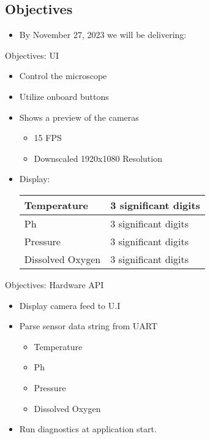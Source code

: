 \documentclass[14pt, aspectratio=169]{beamer}
\begin{document}
\subsection{Objectives}
\begin{frame}
	\begin{itemize}
		\item By November 27, 2023 we will be delivering:
	\end{itemize}
\end{frame}
\begin{frame}{Objectives: UI}
	\begin{itemize}
		\item Control the microscope
		\item Utilize onboard buttons
		\item Shows a preview of the cameras
		      \begin{itemize}
			      \item 15 FPS
			      \item Downscaled 1920x1080 Resolution
		      \end{itemize}
		\item Display:
		      \begin{table}[h!]
			      \begin{tabular}{|l|l|}
				      \hline
				      Temperature      & 3 significant digits \\ \hline
				      Ph               & 3 significant digits \\ \hline
				      Pressure         & 3 significant digits \\ \hline
				      Dissolved Oxygen & 3 significant digits \\ \hline
			      \end{tabular}
		      \end{table}
	\end{itemize}
\end{frame}
\begin{frame}{Objectives: Hardware API}
	\begin{itemize}
		\item Display camera feed to U.I
		\item Parse sensor data string from UART
		      \begin{itemize}
			      \item Temperature
			      \item Ph
			      \item Pressure
			      \item Dissolved Oxygen
		      \end{itemize}
		\item Run diagnostics at application start.
	\end{itemize}
\end{frame}
\end{document}
